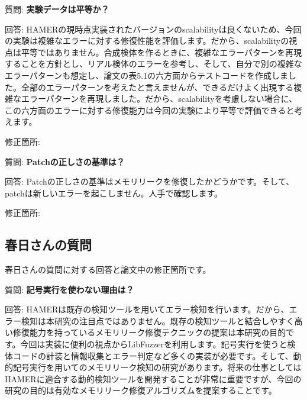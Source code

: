 \documentclass[a4paper,10pt]{article}
\begin{document}
質問: \textbf{実験データは平等か？}

回答: HAMERの現時点実装されたバージョンのscalabilityは良くないため、今回の実験は複雑なエラーに対する修復性能を評価します。だから、scalabilityの視点は平等ではありません。合成検体を作るときに、複雑なエラーパターンを再現することを方針とし、リアル検体のエラーを参考し、そして、自分で別の複雑なエラーパターンも想定し、論文の表5.1の六方面からテストコードを作成しました。全部のエラーパターンを考えたと言えませんが、できるだけよく出現する複雑なエラーパターンを再現しました。だから、scalabilityを考慮しない場合に、この六方面のエラーに対する修復能力は今回の実験により平等で評価できると考えます。


修正箇所:

\vspace{0.5cm}

質問: \textbf{Patchの正しさの基準は？}

回答: Patchの正しさの基準はメモリリークを修復したかどうかです。そして、patchは新しいエラーを起こしません。人手で確認します。

修正箇所:

\vspace{0.5cm}

\subsection{春日さんの質問}
春日さんの質問に対する回答と論文中の修正箇所です。

質問: \textbf{記号実行を使わない理由は？}

回答: HAMERは既存の検知ツールを用いてエラー検知を行います。だから、エラー検知は本研究の注目点ではありません。既存の検知ツールと結合しやすく高い修復能力を持っているメモリリーク修復テクニックの提案は本研究の目的です。今回は実装に便利の視点からLibFuzzerを利用します。記号実行を使うと検体コードの計装と情報収集とエラー判定など多くの実装が必要です。そして、動的記号実行を用いてのメモリリーク検知の研究があります。将来の仕事としてはHAMERに適合する動的検知ツールを開発することが非常に重要ですが、今回の研究の目的は有効なメモリリーク修復アルゴリズムを提案することです。
\end{document}
